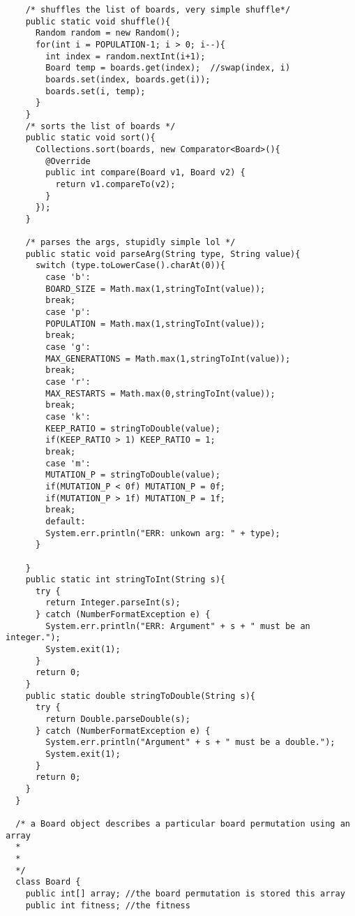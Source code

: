 \documentclass[a4paper,11pt]{article}
\begin{document}
\begin{lstlisting}
    /* shuffles the list of boards, very simple shuffle*/
    public static void shuffle(){
      Random random = new Random();
      for(int i = POPULATION-1; i > 0; i--){
        int index = random.nextInt(i+1);
        Board temp = boards.get(index);  //swap(index, i)
        boards.set(index, boards.get(i));
        boards.set(i, temp);
      }
    }
    /* sorts the list of boards */
    public static void sort(){
      Collections.sort(boards, new Comparator<Board>(){
        @Override
        public int compare(Board v1, Board v2) {
          return v1.compareTo(v2);
        }
      });
    }

    /* parses the args, stupidly simple lol */
    public static void parseArg(String type, String value){
      switch (type.toLowerCase().charAt(0)){
        case 'b':
        BOARD_SIZE = Math.max(1,stringToInt(value));
        break;
        case 'p':
        POPULATION = Math.max(1,stringToInt(value));
        break;
        case 'g':
        MAX_GENERATIONS = Math.max(1,stringToInt(value));
        break;
        case 'r':
        MAX_RESTARTS = Math.max(0,stringToInt(value));
        break;
        case 'k':
        KEEP_RATIO = stringToDouble(value);
        if(KEEP_RATIO > 1) KEEP_RATIO = 1;
        break;
        case 'm':
        MUTATION_P = stringToDouble(value);
        if(MUTATION_P < 0f) MUTATION_P = 0f;
        if(MUTATION_P > 1f) MUTATION_P = 1f;
        break;
        default:
        System.err.println("ERR: unkown arg: " + type);
      }
      
    }
    public static int stringToInt(String s){
      try {
        return Integer.parseInt(s);
      } catch (NumberFormatException e) {
        System.err.println("ERR: Argument" + s + " must be an integer.");
        System.exit(1);
      }
      return 0;
    }
    public static double stringToDouble(String s){
      try {
        return Double.parseDouble(s);
      } catch (NumberFormatException e) {
        System.err.println("Argument" + s + " must be a double.");
        System.exit(1);
      }
      return 0;
    }
  }

  /* a Board object describes a particular board permutation using an array
  * 
  * 
  */
  class Board {
    public int[] array; //the board permutation is stored this array
    public int fitness; //the fitness


\end{lstlisting}
\end{document}
